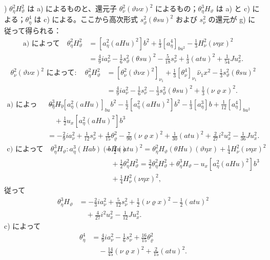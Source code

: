 \documentclass[11pt]{article}
\newcommand{\R}{\varrho}
\begin{document}
) $\theta_\eta^2H_\vartheta^2$ は a) によるものと、還元子 $\theta_\nu^2(\vartheta\nu x)^2$ によるもの；$\theta_\eta^3H_\vartheta$ は a) と c) による；$\theta_\eta^4$ は c) による。ここから高次形式 $s_\vartheta^2(\theta su)^2$ および $s_\nu^2$ の還元が g) に従って得られる：
\[
\begin{aligned}
\text{a) によって}\quad
\theta_\eta^2H_\vartheta^2&=[a_\eta^2(aHu)^2]b^2+\frac13[a_\eta^4]_{bu^2}-\frac13H_\nu^2(\nu\eta x)^2\\
&=\frac49ia_\nu^2-\frac16s_\vartheta^2(\theta su)^2-\frac5{18}s_\nu^2+\frac13(atu)^2+\frac1{54}Ju_x^2.
\end{aligned}
\]
\[
\begin{aligned}
\theta_\nu^2(\vartheta\nu x)^2\text{ によって}:
\quad\theta_\eta^2H_\vartheta^2
&=[\theta_\nu^2(\vartheta\nu x)^2]_{\nu_1}+\frac13[\theta_\nu^4]_{\nu_1}\hat\nu_1x^2-\frac13s_\vartheta^2(\theta su)^2\\
&=\frac49ia_\nu^2-\frac16s_\nu^2-\frac13s_\vartheta^2(\theta su)^2+\frac13(\nu\R x)^2.
\end{aligned}
\]
\[
\begin{aligned}
\text{a) によって}\quad
\theta_\eta^3H_\vartheta&=-[a_\eta^2(aHu)]_{bu}b^2-\frac12[a_\eta^2(aHu)^2]b^2-\frac13[a_\eta^3]b+\frac1{12}[a_\eta^4]_{bu^2}\\
&\quad+\frac12u_x[a_\eta^2(aHu)^2]b^3\\
&=-\frac29ia_\nu^2+\frac1{12}s_\nu^2+\frac4{15}\theta_\R^2-\frac7{90}(\nu\R x)^2+\frac1{30}(atu)^2+\frac2{27}i^2u_x^2-\frac1{36}Ju_x^2.
\end{aligned}
\]
\[
\begin{aligned}
\text{c) によって}\quad
\theta_\eta^3H_\vartheta:
 a_\eta^3(Hab)(bHu)&=\frac12(atu)^2
=\theta_\eta^2H_\vartheta(\theta Hu)(\vartheta\eta x)+\frac14H_\nu^2(\nu\eta x)^2\\
&\quad+\frac12\theta_\eta^2H_\vartheta^2
=\frac32\theta_\eta^2H_\vartheta^2+\theta_\eta^3H_\vartheta-u_x[a_\eta^2(aHu)^2]b^3\\
&\quad+\frac14H_\nu^2(\nu\eta x)^2,
\end{aligned}
\]
従って
\[
\begin{aligned}
\theta_\eta^3H_\vartheta&=-\frac23ia_\nu^2+\frac5{12}s_\nu^2+\frac12(\nu\R x)^2-\frac12(atu)^2\\
&\quad+\frac4{27}i^2u_x^2-\frac1{12}Ju_x^2.
\end{aligned}
\]
c) によって
\[
\begin{aligned}
\theta_\eta^4&=\frac49ia_\nu^2-\frac16s_\nu^2+\frac{16}{15}\theta_\R^2\\
&\quad-\frac{14}{45}(\nu\R x)^2+\frac2{15}(atu)^2.
\end{aligned}
\]
\end{document}
